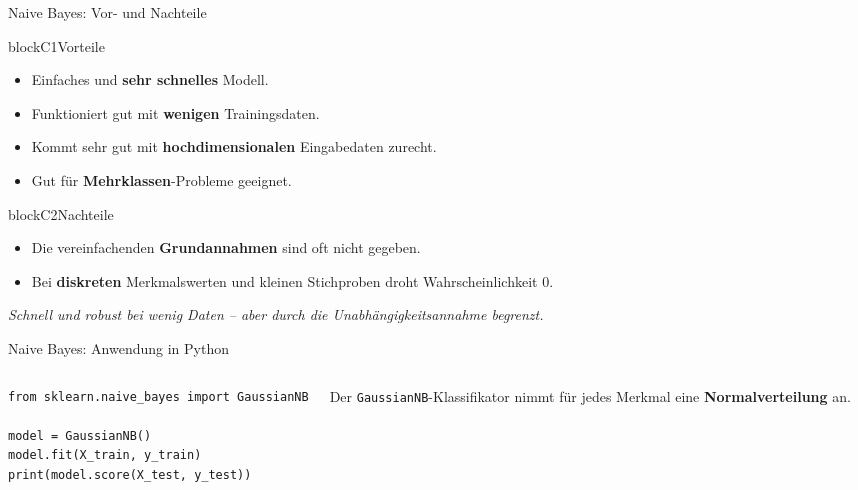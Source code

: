 \begin{frame}{Naive Bayes: Vor- und Nachteile}
\begin{blockrow}
  \begin{blockcol}{0.50\textwidth}{blockC1}{Vorteile}
\begin{itemize}
  \item Einfaches und \textbf{sehr schnelles} Modell.
  \item Funktioniert gut mit \textbf{wenigen} Trainingsdaten.
  \item Kommt sehr gut mit \textbf{hochdimensionalen} Eingabedaten zurecht.
  \item Gut für \textbf{Mehrklassen}-Probleme geeignet.
\end{itemize}
  \end{blockcol}

  \begin{blockcol}{0.46\textwidth}{blockC2}{Nachteile}
\begin{itemize}
  \item Die vereinfachenden \textbf{Grundannahmen} sind oft nicht gegeben.
  \item Bei \textbf{diskreten} Merkmalswerten und kleinen Stichproben droht Wahrscheinlichkeit
        $0$.
\end{itemize}
  \end{blockcol}
\end{blockrow}

\vspace{0.6em}
\centering
{\footnotesize\itshape Schnell und robust bei wenig Daten -- aber durch die
Unabhängigkeitsannahme begrenzt.}
\end{frame}

\makequizpage{\QUIZURL}{\QUIZQRCODE}{\QUIZIMAGE}
\makequestionspage{\FRAGENIMAGE}


\begin{frame}[fragile]{Naive Bayes: Anwendung in Python}
\begin{columns}
\begin{verbatim}
from sklearn.naive_bayes import GaussianNB

model = GaussianNB()
model.fit(X_train, y_train)
print(model.score(X_test, y_test))
\end{verbatim}

\vspace{0.4em}
Der \texttt{GaussianNB}-Klassifikator nimmt für jedes Merkmal eine
\textbf{Normalverteilung} an.

\centering

\end{columns}
\end{frame}

